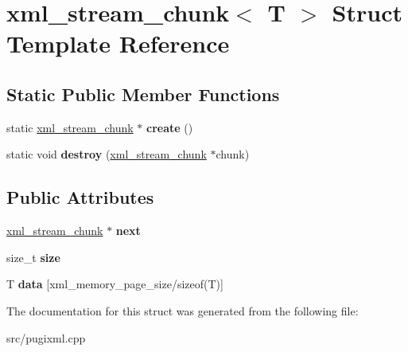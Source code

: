 \hypertarget{structxml__stream__chunk}{}\section{xml\+\_\+stream\+\_\+chunk$<$ T $>$ Struct Template Reference}
\label{structxml__stream__chunk}
\subsection*{Static Public Member Functions}
\begin{DoxyCompactItemize}
\item 
\mbox{\label{structxml__stream__chunk_a92cffe33c529ff266329fd4afb59226d}} 
static \hyperlink{structxml__stream__chunk}{xml\+\_\+stream\+\_\+chunk} $\ast$ {\bfseries create} ()
\item 
\mbox{\label{structxml__stream__chunk_a3e9bf7280c96a7433d60af129873a16f}} 
static void {\bfseries destroy} (\hyperlink{structxml__stream__chunk}{xml\+\_\+stream\+\_\+chunk} $\ast$chunk)
\end{DoxyCompactItemize}
\subsection*{Public Attributes}
\begin{DoxyCompactItemize}
\item 
\mbox{\label{structxml__stream__chunk_ad00071f7340adb2bde7c4157d4100b3c}} 
\hyperlink{structxml__stream__chunk}{xml\+\_\+stream\+\_\+chunk} $\ast$ {\bfseries next}
\item 
\mbox{\label{structxml__stream__chunk_a42618ba3b7bda1246cfc640149fc34eb}} 
size\+\_\+t {\bfseries size}
\item 
\mbox{\label{structxml__stream__chunk_a365e2e228a0277467b25a0fea42b8518}} 
T {\bfseries data} \mbox{[}xml\+\_\+memory\+\_\+page\+\_\+size/sizeof(T)\mbox{]}
\end{DoxyCompactItemize}


The documentation for this struct was generated from the following file\+:\begin{DoxyCompactItemize}
\item 
src/pugixml.\+cpp\end{DoxyCompactItemize}
